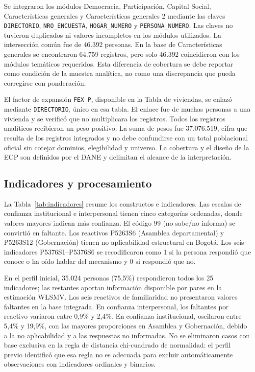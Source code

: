 \documentclass[11pt,letterpaper]{article}
\begin{document}
Se integraron los módulos Democracia, Participación, Capital Social, Características generales y Características generales 2 mediante las claves \texttt{DIRECTORIO}, \texttt{NRO\_ENCUESTA}, \texttt{HOGAR\_NUMERO} y \texttt{PERSONA\_NUMERO}. Las claves no tuvieron duplicados ni valores incompletos en los módulos utilizados. La intersección común fue de 46.392 personas. En la base de Características generales se encontraron 64.759 registros, pero solo 46.392 coincidieron con los módulos temáticos requeridos. Esta diferencia de cobertura se debe reportar como condición de la muestra analítica, no como una discrepancia que pueda corregirse con ponderación.

El factor de expansión \texttt{FEX\_P}, disponible en la Tabla de viviendas, se enlazó mediante \texttt{DIRECTORIO}, único en esa tabla. El enlace fue de muchas personas a una vivienda y se verificó que no multiplicara los registros. Todos los registros analíticos recibieron un peso positivo. La suma de pesos fue 37.076.519, cifra que resulta de los registros integrados y no debe confundirse con un total poblacional oficial sin cotejar dominios, elegibilidad y universo. La cobertura y el diseño de la ECP son definidos por el DANE y delimitan el alcance de la interpretación.

\subsection{Indicadores y procesamiento}

La Tabla~\ref{tab:indicadores} resume los constructos e indicadores. Las escalas de confianza institucional e interpersonal tienen cinco categorías ordenadas, donde valores mayores indican más confianza. El código 99 (no sabe/no informa) se convirtió en faltante. Los reactivos P5263S6 (Asamblea departamental) y P5263S12 (Gobernación) tienen no aplicabilidad estructural en Bogotá. Los seis indicadores P5376S1--P5376S6 se recodificaron como 1 si la persona respondió que conoce o ha oído hablar del mecanismo y 0 si respondió que no.

En el perfil inicial, 35.024 personas (75,5\%) respondieron todos los 25 indicadores; las restantes aportan información disponible por pares en la estimación WLSMV. Los seis reactivos de familiaridad no presentaron valores faltantes en la base integrada. En confianza interpersonal, los faltantes por reactivo variaron entre 0,9\% y 2,4\%. En confianza institucional, oscilaron entre 5,4\% y 19,9\%, con las mayores proporciones en Asamblea y Gobernación, debido a la no aplicabilidad y a las respuestas no informadas. No se eliminaron casos con base exclusiva en la regla de distancia chi-cuadrado de normalidad: el perfil previo identificó que esa regla no es adecuada para excluir automáticamente observaciones con indicadores ordinales y binarios.
\end{document}
